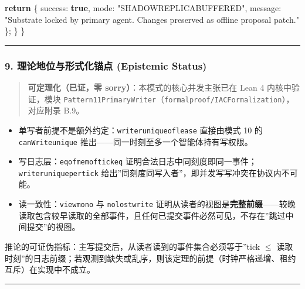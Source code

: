 \documentclass[
]{ctexart}
\newenvironment{Shaded}{}{}
\newcommand{\ControlFlowTok}[1]{\textcolor[rgb]{0.00,0.44,0.13}{\textbf{#1}}}
\newcommand{\KeywordTok}[1]{\textcolor[rgb]{0.00,0.44,0.13}{\textbf{#1}}}
\newcommand{\NormalTok}[1]{#1}
\newcommand{\OperatorTok}[1]{\textcolor[rgb]{0.40,0.40,0.40}{#1}}
\newcommand{\StringTok}[1]{\textcolor[rgb]{0.25,0.44,0.63}{#1}}
\providecommand{\tightlist}{%
  \setlength{\itemsep}{0pt}\setlength{\parskip}{0pt}}
\renewcommand{\_}{\discretionary{}{}{\textunderscore}}
\begin{document}
\begin{Shaded}
\begin{Highlighting}[]
    \ControlFlowTok{return}\NormalTok{ \{}
\NormalTok{      success}\OperatorTok{:} \KeywordTok{true}\OperatorTok{,}
\NormalTok{      mode}\OperatorTok{:} \StringTok{"SHADOW\_REPLICA\_BUFFERED"}\OperatorTok{,}
\NormalTok{      message}\OperatorTok{:} \StringTok{"Substrate locked by primary agent. Changes preserved as offline proposal patch."}
\NormalTok{    \}}\OperatorTok{;}
\NormalTok{  \}}
\NormalTok{\}}
\end{Highlighting}
\end{Shaded}

\begin{center}\rule{0.5\linewidth}{0.5pt}\end{center}

\subsubsection{9. 理论地位与形式化锚点 (Epistemic
Status)}\label{ux7406ux8bbaux5730ux4f4dux4e0eux5f62ux5f0fux5316ux951aux70b9-epistemic-status}

\begin{quote}
\textbf{可定理化（已证，零 sorry）}：本模式的核心并发主张已在 Lean 4
内核中验证，模块
\texttt{Pattern11\_PrimaryWriter}（\texttt{formal\_proof/IACFormalization}），对应附录
B.9。
\end{quote}

\begin{itemize}
\tightlist
\item
  单写者前提不是额外约定：\texttt{writer\_unique\_of\_lease} 直接由模式
  10 的 \texttt{canWrite\_unique}
  推出------同一时刻至多一个智能体持有写权限。
\item
  写日志层：\texttt{eq\_of\_mem\_of\_tick\_eq}
  证明合法日志中同刻度即同一事件；\texttt{writer\_unique\_per\_tick}
  给出''同刻度同写入者''，即并发写写冲突在协议内不可能。
\item
  读一致性：\texttt{view\_mono} 与 \texttt{no\_lost\_write}
  证明从读者的视图是\textbf{完整前缀}------较晚读取包含较早读取的全部事件，且任何已提交事件必然可见，不存在''跳过中间提交''的视图。
\end{itemize}

推论的可证伪指标：主写提交后，从读者读到的事件集合必须等于''tick \(\le\)
读取时刻''的日志前缀；若观测到缺失或乱序，则该定理的前提（时钟严格递增、租约互斥）在实现中不成立。

\begin{center}\rule{0.5\linewidth}{0.5pt}\end{center}
\end{document}
